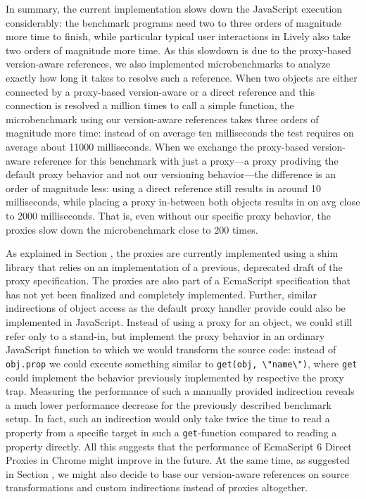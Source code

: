 In summary, the current implementation slows down the JavaScript execution considerably: the benchmark programs need two to three orders of magnitude more time to finish, while particular typical user interactions in Lively also take two orders of magnitude more time.
As this slowdown is due to the proxy-based version-aware references, we also implemented microbenchmarks to analyze exactly how long it takes to resolve such a reference.
When two objects are either connected by a proxy-based version-aware or a direct reference and this connection is resolved a million times to call a simple function, the microbenchmark using our version-aware references takes three orders of magnitude more time: instead of on average ten milliseconds the test requires on average about 11000 milliseconds.
When we exchange the proxy-based version-aware reference for this benchmark with just a proxy---a proxy prodiving the default proxy behavior and not our versioning behavior---the difference is an order of magnitude less: using a direct reference still results in around 10 milliseconds, while placing a proxy in-between both objects results in on avg close to 2000 milliseconds.
That is, even without our specific proxy behavior, the proxies slow down the microbenchmark close to 200 times.

As explained in Section , the proxies are currently implemented using a shim library that relies on an implementation of a previous, deprecated draft of the proxy specification.
The proxies are also part of a EcmaScript specification that has not yet been finalized and completely implemented.
Further, similar indirections of object access as the default proxy handler provide could also be implemented in JavaScript.
Instead of using a proxy for an object, we could still refer only to a stand-in, but implement the proxy behavior in an ordinary JavaScript function to which we would transform the source code: instead of \lstinline{obj.prop} we could execute something similar to \lstinline{get(obj, \"name\")}, where \lstinline{get} could implement the behavior previously implemented by respective the proxy trap.
Measuring the performance of such a manually provided indirection reveals a much lower performance decrease for the previously described benchmark setup.
In fact, such an indirection would only take twice the time to read a property from a specific target in such a \lstinline{get}-function compared to reading a property directly. 
All this suggests that the performance of EcmaScript 6 Direct Proxies in Chrome might improve in the future.
At the same time, as suggested in Section , we might also decide to base our version-aware references on source transformations and custom indirections instead of proxies altogether.

